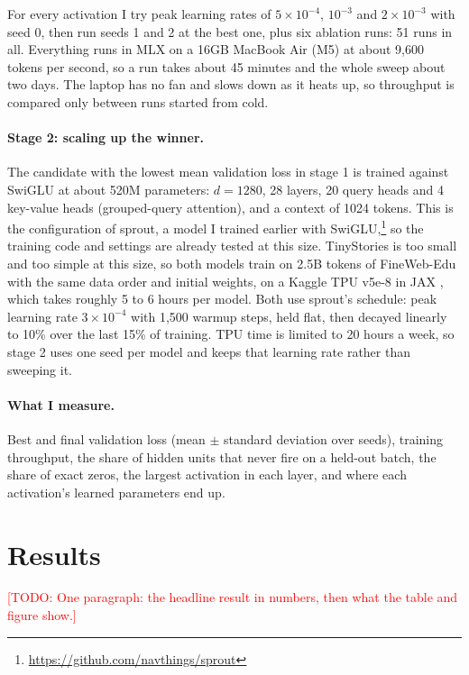 \documentclass{article}
\newcommand{\todo}[1]{\textcolor{red}{[TODO: #1]}}
\begin{document}
For every activation I try peak learning rates of $5\times10^{-4}$, $10^{-3}$ and $2\times10^{-3}$ with seed 0, then run seeds 1 and 2 at the best one, plus six ablation runs: 51 runs in all.
Everything runs in MLX \citep{hannun2023mlx} on a 16GB MacBook Air (M5) at about 9,600 tokens per second, so a run takes about 45 minutes and the whole sweep about two days.
The laptop has no fan and slows down as it heats up, so throughput is compared only between runs started from cold.

\paragraph{Stage 2: scaling up the winner.}
The candidate with the lowest mean validation loss in stage 1 is trained against SwiGLU at about 520M parameters: $d = 1280$, 28 layers, 20 query heads and 4 key-value heads (grouped-query attention), and a context of 1024 tokens.
This is the configuration of sprout, a model I trained earlier with SwiGLU,\footnote{\url{https://github.com/navthings/sprout}} so the training code and settings are already tested at this size.
TinyStories is too small and too simple at this size, so both models train on 2.5B tokens of FineWeb-Edu \citep{penedo2024fineweb} with the same data order and initial weights, on a Kaggle TPU v5e-8 in JAX \citep{jax2018github}, which takes roughly 5 to 6 hours per model.
Both use sprout's schedule: peak learning rate $3\times10^{-4}$ with 1,500 warmup steps, held flat, then decayed linearly to 10\% over the last 15\% of training.
TPU time is limited to 20 hours a week, so stage 2 uses one seed per model and keeps that learning rate rather than sweeping it.

\paragraph{What I measure.}
Best and final validation loss (mean $\pm$ standard deviation over seeds), training throughput, the share of hidden units that never fire on a held-out batch, the share of exact zeros, the largest activation in each layer, and where each activation's learned parameters end up.

\section{Results}
\label{sec:results}

\todo{One paragraph: the headline result in numbers, then what the table and figure show.}
\end{document}
